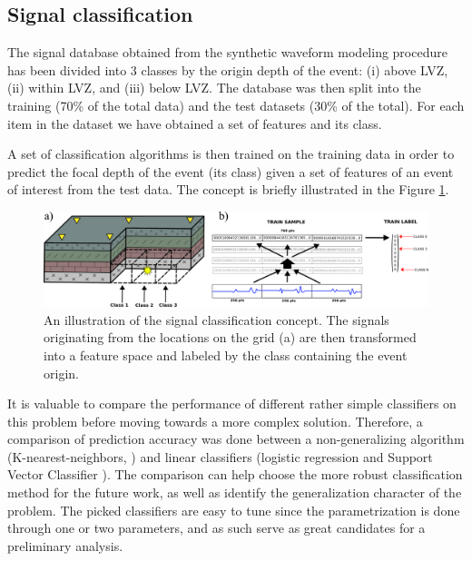 \subsection{Signal classification}
The signal database obtained from the synthetic waveform modeling procedure has been divided into 3 classes by the origin depth of the event: (i) above LVZ, (ii) within LVZ, and (iii) below LVZ. The database was then split into the training (70\% of the total data) and the test datasets (30\% of the total). For each item in the dataset we have obtained a set of features and its class.

A set of classification algorithms is then trained on the training data in order to predict the focal depth of the event (its class) given a set of features of an event of interest from the test data. The concept is briefly illustrated in the Figure \ref{fig:classes}.

\begin{figure}[htb]
\begin{center}
\includegraphics[width=0.85\linewidth,angle=0]{./AntonBiryukov_bibtex/classes.png}
\end{center}
\vspace{-4mm}
\caption{An illustration of the signal classification concept. The signals originating from the locations on the grid (a) are then transformed into a feature space and labeled by the class containing the event origin.}
\label{fig:classes}
\end{figure}


It is valuable to compare the performance of different rather simple classifiers on this problem before moving towards a more complex solution. Therefore, a comparison of prediction accuracy was done between a non-generalizing algorithm (K-nearest-neighbors, \cite{}) and linear classifiers (logistic regression\cite{} and Support Vector Classifier \cite{}). The comparison can help choose the more robust classification method for the future work, as well as identify the generalization character of the problem. The picked classifiers are easy to tune since the parametrization is done through one or two parameters, and as such serve as great candidates for a preliminary analysis. 

